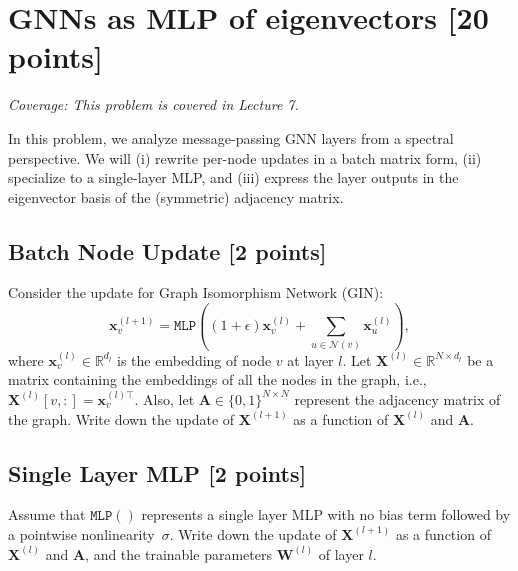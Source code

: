\section{GNNs as MLP of eigenvectors  [20 points]}
\noindent\textit{Coverage: This problem is covered in Lecture 7.}

In this problem, we analyze message-passing GNN layers from a spectral perspective. 
We will (i) rewrite per-node updates in a batch matrix form, (ii) specialize to a single-layer MLP, and (iii) express the layer outputs in the eigenvector basis of the (symmetric) adjacency matrix.


\subsection{Batch Node Update [2 points]}
Consider the update for Graph Isomorphism Network (GIN):
\begin{equation}
    \mathbf{x}_v^{(l+1)} =  \texttt{MLP}\left(\left( 1+\epsilon\right) \mathbf{x}_v^{(l)}+\sum_{u\in\mathcal{N}\left(v\right)}\mathbf{x}_u^{(l)}\right),
\end{equation}
where $\mathbf{x}_v^{(l)}\in\mathbb{R}^{d_l}$ is the embedding of node $v$ at layer $l$. Let $\mathbf{X}^{(l)}\in\mathbb{R}^{N\times d_l}$ be a matrix containing the embeddings of all the nodes in the graph, i.e., $\mathbf{X}^{(l)}[v,:]=\mathbf{x}_v^{(l)\top}$. Also, let $\mathbf{A}\in\{0,1\}^{N\times N}$ represent the adjacency matrix of the graph. Write down the update of $\mathbf{X}^{(l+1)}$ as a function of $\mathbf{X}^{(l)}$ and $\mathbf{A}$.


\subsection{Single Layer MLP [2 points]}
Assume that $\texttt{MLP}\left(\right)$ represents a single layer MLP with no bias term followed by a pointwise nonlinearity~$\sigma$. Write down the update of $\mathbf{X}^{(l+1)}$ as a function of $\mathbf{X}^{(l)}$ and $\mathbf{A}$, and the trainable parameters $\mathbf{W}^{(l)}$ of layer $l$.


